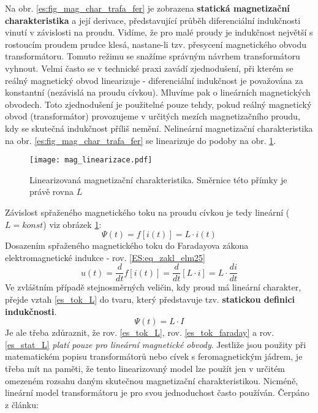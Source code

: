 {    Na obr. \ref{es:fig_mag_char_trafa_fer} je zobrazena \textbf{statická magnetizační 
    charakteristika} a její derivace, představující průběh diferenciální indukčnosti vinutí v 
    závislosti na proudu. Vidíme, že pro malé proudy je indukčnost největší s rostoucím proudem 
    prudce klesá, nastane-li tzv. přesycení magnetického obvodu transformátoru. Tomuto režimu se 
    snažíme správným návrhem transformátoru vyhnout. Velmi často se v technické praxi zavádí 
    zjednodušení, při kterém se reálný magnetický obvod linearizuje - diferenciální indukčnost je 
    považována za konstantní (nezávislá na proudu cívkou). Mluvíme pak o lineárních magnetických 
    obvodech. Toto zjednodušení je použitelné pouze tehdy, pokud reálný magnetický obvod 
    (transformátor) provozujeme v určitých mezích magnetizačního proudu, kdy se skutečná indukčnost
    příliš nemění. Nelineární magnetizační charakteristika na obr. \ref{es:fig_mag_char_trafa_fer} 
    se linearizuje do podoby na obr. \ref{figure:mag_lin}.

    \begin{figure}[ht!]   %
      \centering
      \texttt{[image: mag\_linearizace.pdf]}
      \caption{Linearizovaná magnetizační charakteristika. Směrnice této přímky je právě rovna $L$}
      \label{figure:mag_lin}
    \end{figure}
    Závislost spřaženého magnetického toku na proudu cívkou je tedy lineární ($L=konst$) viz obrázek
    \ref{figure:mag_lin}:
    \begin{equation}\label{es_tok_L}
      \Psi(t)=f[i(t)] = L \cdot i(t)
    \end{equation}    
    Dosazením spřaženého magnetického toku do Faradayova zákona elektromagnetické indukce - rov.
    \ref{ES:eq_zakl_elm25}
    \begin{equation}\label{es_tok_faraday}
        u(t)=\frac{d}{dt}f[i(t)]=\frac{d}{dt}[L\cdot i]=L\cdot\frac{di}{dt}
    \end{equation}
    Ve zvláštním případě stejnosměrných veličin, kdy proud má lineární charakter, přejde vztah
    \ref{es_tok_L} do tvaru, který představuje tzv. \textbf{statickou definici indukčnosti}.
    \begin{equation}\label{es_stat_L}
      \Psi(t)= L \cdot I
    \end{equation}
    Je ale třeba zdůraznit, že rov. \ref{es_tok_L}, rov. \ref{es_tok_faraday} a rov. 
    \ref{es_stat_L} \emph{platí pouze pro lineární magnetické obvody}. Jestliže jsou použity při 
    matematickém popisu transformátorů nebo cívek s feromagnetickým jádrem, je třeba mít na paměti, 
    že tento linearizovaný model lze použít jen v určitém omezeném rozsahu daným skutečnou 
    magnetizační charakteristikou. Nicméně, lineární model transformátoru je pro svou jednoduchost 
    často používán. Čerpáno z článku: \librarianTrafoModel
    
}
